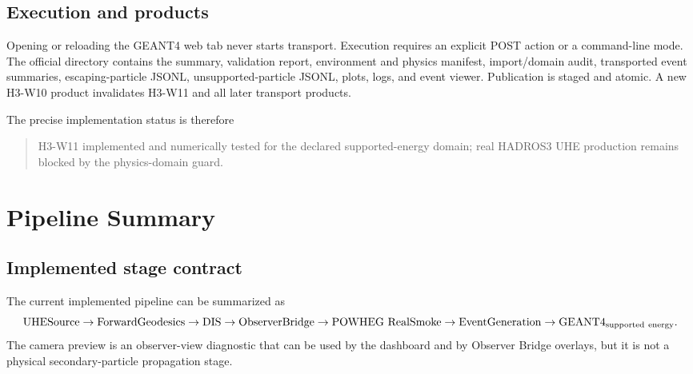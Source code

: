 \documentclass[11pt,a4paper]{report}
\numberwithin{equation}{chapter}
\newcommand{\code}[1]{\texttt{\detokenize{#1}}}
\begin{document}
\section{Execution and products}

Opening or reloading the GEANT4 web tab never starts transport.  Execution
requires an explicit POST action or a command-line mode.  The official
\code{GEANT4/} directory contains the summary, validation report, environment
and physics manifest, import/domain audit, transported event summaries,
escaping-particle JSONL, unsupported-particle JSONL, plots, logs, and event
viewer.  Publication is staged and atomic.  A new H3-W10 product invalidates
H3-W11 and all later transport products.

The precise implementation status is therefore
\begin{quote}
H3-W11 implemented and numerically tested for the declared supported-energy
domain; real HADROS3 UHE production remains blocked by the physics-domain
guard.
\end{quote}

\chapter{Pipeline Summary}

\section{Implemented stage contract}

The current implemented pipeline can be summarized as
\begin{equation}
\mathrm{UHESource}
\rightarrow
\mathrm{ForwardGeodesics}
\rightarrow
\mathrm{DIS}
\rightarrow
\mathrm{ObserverBridge}
\rightarrow
\mathrm{POWHEG\ RealSmoke}
\rightarrow
\mathrm{EventGeneration}
\rightarrow
\mathrm{GEANT4}_{\rm supported\ energy}.
\end{equation}
The camera preview is an observer-view diagnostic that can be used by the
dashboard and by Observer Bridge overlays, but it is not a physical
secondary-particle propagation stage.
\end{document}
